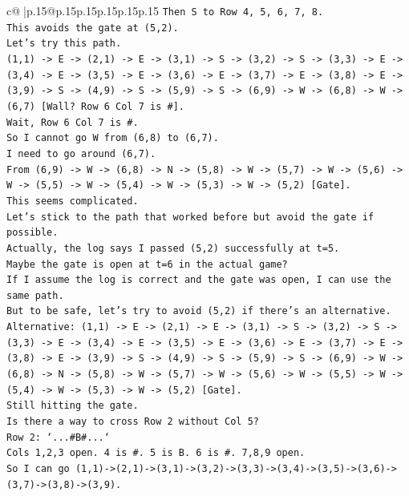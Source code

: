 \documentclass{article}
\begin{document}
{\begin{supertabular}{c@{$\;$}|p{.15\linewidth}@{}p{.15\linewidth}p{.15\linewidth}p{.15\linewidth}p{.15\linewidth}p{.15\linewidth}}
{{{\texttt{Then S to Row 4, 5, 6, 7, 8.} \\
\texttt{This avoids the gate at (5,2).} \\
\texttt{Let's try this path.} \\
\texttt{(1,1) {-}> E {-}> (2,1) {-}> E {-}> (3,1) {-}> S {-}> (3,2) {-}> S {-}> (3,3) {-}> E {-}> (3,4) {-}> E {-}> (3,5) {-}> E {-}> (3,6) {-}> E {-}> (3,7) {-}> E {-}> (3,8) {-}> E {-}> (3,9) {-}> S {-}> (4,9) {-}> S {-}> (5,9) {-}> S {-}> (6,9) {-}> W {-}> (6,8) {-}> W {-}> (6,7) {[}Wall? Row 6 Col 7 is \#{]}.} \\
\texttt{Wait, Row 6 Col 7 is \#.} \\
\texttt{So I cannot go W from (6,8) to (6,7).} \\
\texttt{I need to go around (6,7).} \\
\texttt{From (6,9) {-}> W {-}> (6,8) {-}> N {-}> (5,8) {-}> W {-}> (5,7) {-}> W {-}> (5,6) {-}> W {-}> (5,5) {-}> W {-}> (5,4) {-}> W {-}> (5,3) {-}> W {-}> (5,2) {[}Gate{]}.} \\
\texttt{This seems complicated.} \\
\texttt{Let's stick to the path that worked before but avoid the gate if possible.} \\
\texttt{Actually, the log says I passed (5,2) successfully at t=5.} \\
\texttt{Maybe the gate is open at t=6 in the actual game?} \\
\texttt{If I assume the log is correct and the gate was open, I can use the same path.} \\
\texttt{But to be safe, let's try to avoid (5,2) if there's an alternative.} \\
\texttt{Alternative: (1,1) {-}> E {-}> (2,1) {-}> E {-}> (3,1) {-}> S {-}> (3,2) {-}> S {-}> (3,3) {-}> E {-}> (3,4) {-}> E {-}> (3,5) {-}> E {-}> (3,6) {-}> E {-}> (3,7) {-}> E {-}> (3,8) {-}> E {-}> (3,9) {-}> S {-}> (4,9) {-}> S {-}> (5,9) {-}> S {-}> (6,9) {-}> W {-}> (6,8) {-}> N {-}> (5,8) {-}> W {-}> (5,7) {-}> W {-}> (5,6) {-}> W {-}> (5,5) {-}> W {-}> (5,4) {-}> W {-}> (5,3) {-}> W {-}> (5,2) {[}Gate{]}.} \\
\texttt{Still hitting the gate.} \\
\texttt{Is there a way to cross Row 2 without Col 5?} \\
\texttt{Row 2: `...\#B\#...`} \\
\texttt{Cols 1,2,3 open. 4 is \#. 5 is B. 6 is \#. 7,8,9 open.} \\
\texttt{So I can go (1,1){-}>(2,1){-}>(3,1){-}>(3,2){-}>(3,3){-}>(3,4){-}>(3,5){-}>(3,6){-}>(3,7){-}>(3,8){-}>(3,9).} \\
}}}
\end{supertabular}}
\end{document}
